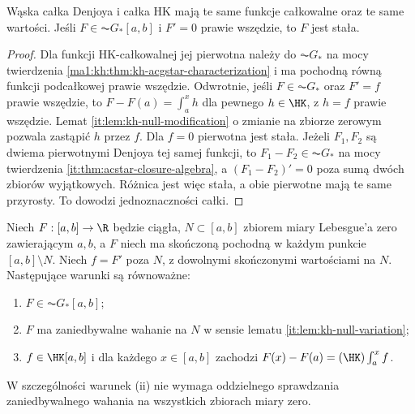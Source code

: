 \begin{wniosek}[Denjoy = HK]\label{it:cor:denjoy-hk}
Wąska całka Denjoya i całka HK mają te same funkcje całkowalne oraz te same wartości. Jeśli $F\in\AC G_*[a,b]$ i $F'=0$ prawie wszędzie, to $F$ jest stała.
\end{wniosek}
\begin{proof}
Dla funkcji HK-całkowalnej jej pierwotna należy do $\AC G_*$ na mocy twierdzenia \ref{ma1:kh:thm:kh-acgstar-characterization} i ma pochodną równą funkcji podcałkowej prawie wszędzie. Odwrotnie, jeśli $F\in\AC G_*$ oraz $F'=f$ prawie wszędzie, to $F-F(a)=\int_a^x h$ dla pewnego $h\in\HK$, z $h=f$ prawie wszędzie. Lemat \ref{it:lem:kh-null-modification} o zmianie na zbiorze zerowym pozwala zastąpić $h$ przez $f$. Dla $f=0$ pierwotna jest stała. Jeżeli $F_1,F_2$ są dwiema pierwotnymi Denjoya tej samej funkcji, to $F_1-F_2\in\AC G_*$ na mocy twierdzenia \ref{it:thm:acstar-closure-algebra}, a $(F_1-F_2)'=0$ poza sumą dwóch zbiorów wyjątkowych. Różnica jest więc stała, a obie pierwotne mają te same przyrosty. To dowodzi jednoznaczności całki.
\end{proof}
\begin{twierdzenie}
\label{it:thm:denjoy-exceptional-variation}
Niech $F:[a,b]\to\R$ będzie ciągła, $N\subset[a,b]$
zbiorem miary Lebesgue'a zero zawierającym $a,b$,
a $F$ niech ma skończoną pochodną w każdym punkcie
$[a,b]\setminus N$. Niech $f=F'$ poza $N$, z dowolnymi
skończonymi wartościami na $N$. Następujące warunki
są równoważne:
\begin{enumerate}[label=(\roman*)]
\item $F\in\AC G_*[a,b]$;
\item $F$ ma zaniedbywalne wahanie na $N$ w sensie lematu
\ref{it:lem:kh-null-variation};
\item $f\in\HK[a,b]$ i dla każdego $x\in[a,b]$ zachodzi
$F(x)-F(a)=(\HK)\int_a^x f$.
\end{enumerate}
W szczególności warunek (ii) nie wymaga oddzielnego
sprawdzania zaniedbywalnego wahania na wszystkich
zbiorach miary zero.
\end{twierdzenie}
